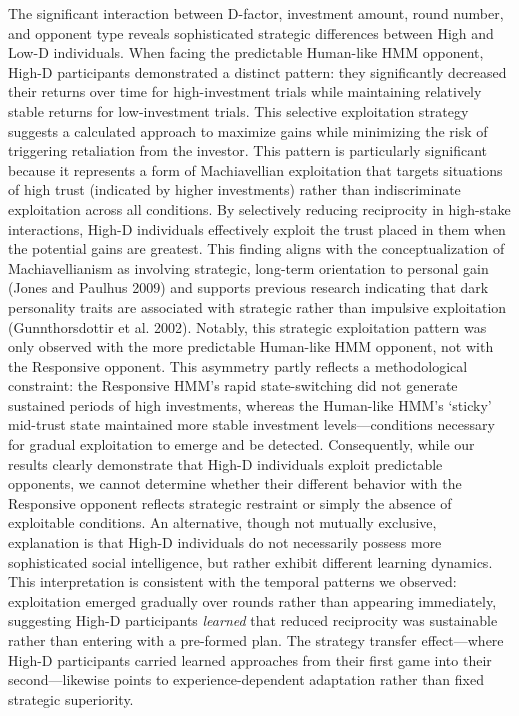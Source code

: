 \documentclass[
]{article}
\begin{document}
The significant interaction between D-factor, investment amount, round number, and opponent type reveals sophisticated strategic differences between High and Low-D individuals.
When facing the predictable Human-like HMM opponent, High-D participants demonstrated a distinct pattern: they significantly decreased their returns over time for high-investment trials while maintaining relatively stable returns for low-investment trials.
This selective exploitation strategy suggests a calculated approach to maximize gains while minimizing the risk of triggering retaliation from the investor.
This pattern is particularly significant because it represents a form of Machiavellian exploitation that targets situations of high trust (indicated by higher investments) rather than indiscriminate exploitation across all conditions.
By selectively reducing reciprocity in high-stake interactions, High-D individuals effectively exploit the trust placed in them when the potential gains are greatest.
This finding aligns with the conceptualization of Machiavellianism as involving strategic, long-term orientation to personal gain (Jones and Paulhus 2009) and supports previous research indicating that dark personality traits are associated with strategic rather than impulsive exploitation (Gunnthorsdottir et al. 2002).
Notably, this strategic exploitation pattern was only observed with the more predictable Human-like HMM opponent, not with the Responsive opponent. This asymmetry partly reflects a methodological constraint: the Responsive HMM's rapid state-switching did not generate sustained periods of high investments, whereas the Human-like HMM's `sticky' mid-trust state maintained more stable investment levels---conditions necessary for gradual exploitation to emerge and be detected. Consequently, while our results clearly demonstrate that High-D individuals exploit predictable opponents, we cannot determine whether their different behavior with the Responsive opponent reflects strategic restraint or simply the absence of exploitable conditions.
An alternative, though not mutually exclusive, explanation is that High-D individuals do not necessarily possess more sophisticated social intelligence, but rather exhibit different learning dynamics.
This interpretation is consistent with the temporal patterns we observed: exploitation emerged gradually over rounds rather than appearing immediately, suggesting High-D participants \emph{learned} that reduced reciprocity was sustainable rather than entering with a pre-formed plan.
The strategy transfer effect---where High-D participants carried learned approaches from their first game into their second---likewise points to experience-dependent adaptation rather than fixed strategic superiority.
\end{document}
